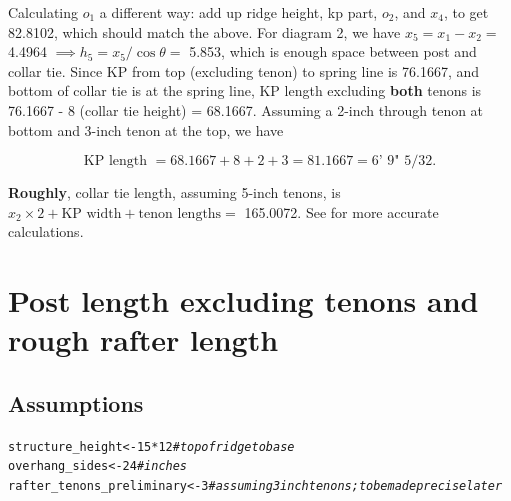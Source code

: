 \documentclass{article}\usepackage[]{graphicx}\usepackage[]{xcolor}
\makeatletter
\newcommand{\hlnum}[1]{\textcolor[rgb]{0.686,0.059,0.569}{#1}}%
\newcommand{\hlcom}[1]{\textcolor[rgb]{0.678,0.584,0.686}{\textit{#1}}}%
\newcommand{\hlopt}[1]{\textcolor[rgb]{0,0,0}{#1}}%
\newcommand{\hlstd}[1]{\textcolor[rgb]{0.345,0.345,0.345}{#1}}%
\newcommand{\hlkwb}[1]{\textcolor[rgb]{0.69,0.353,0.396}{#1}}%
\newenvironment{kframe}{%
 \def\at@end@of@kframe{}%
 \ifinner\ifhmode%
  \def\at@end@of@kframe{\end{minipage}}%
  \begin{minipage}{\columnwidth}%
 \fi\fi%
 \def\FrameCommand##1{\hskip\@totalleftmargin \hskip-\fboxsep
 \colorbox{shadecolor}{##1}\hskip-\fboxsep
     \hskip-\linewidth \hskip-\@totalleftmargin \hskip\columnwidth}%
 \MakeFramed {\advance\hsize-\width
   \@totalleftmargin\z@ \linewidth\hsize
   \@setminipage}}%
 {\par\unskip\endMakeFramed%
 \at@end@of@kframe}
\newenvironment{knitrout}{}{} %
\makeatother
\begin{document}
Calculating $o_1$ a different way: add up ridge height, kp part, $o_2$, and $x_4$, to get 82.8102, which should match the above. For diagram 2, we have $x_5 = x_1 - x_2 =$ 4.4964 $ \implies h_5 =x_5/\cos\theta = $ 5.853, which is enough space between post and collar tie. Since KP from top (excluding tenon) to spring line is 76.1667, and bottom of collar tie is at the spring line, KP length excluding \textbf{both} tenons is 76.1667 - 8 (collar tie height) = 68.1667. Assuming a 2-inch through tenon at bottom and 3-inch tenon at the top, we have 

\[ \boxed{\text{KP length }= 68.1667 + 8 + 2 + 3 = 81.1667 =  \text{6' 9" 5/32}}.\]

\textbf{Roughly}, collar tie length, assuming 5-inch tenons, is $x_2\times 2 + \text{KP width} + \text{tenon lengths} = $ 165.0072. See  for more accurate calculations.








\section{Post length excluding tenons and rough rafter length}\label{posts-and-rafters}


\subsection{Assumptions}\label{posts-rafters-assumptions}
\begin{knitrout}
\color{fgcolor}\begin{kframe}
\begin{alltt}
\hlstd{structure_height} \hlkwb{<-} \hlnum{15}\hlopt{*}\hlnum{12} \hlcom{# top of ridge to base}
\hlstd{overhang_sides} \hlkwb{<-} \hlnum{24} \hlcom{# inches}
\hlstd{rafter_tenons_preliminary} \hlkwb{<-} \hlnum{3} \hlcom{# assuming 3 inch tenons; to be made precise later}
\end{alltt}
\end{kframe}
\end{knitrout}
\end{document}
